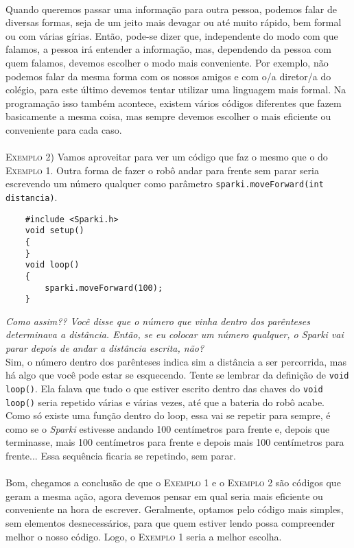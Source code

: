     \paragraph{}
    Quando queremos passar uma informação para outra pessoa, podemos falar de diversas formas, seja de um jeito mais devagar ou até muito rápido, bem formal ou com várias gírias. Então, pode-se dizer que, independente do modo com que falamos, a pessoa irá entender a informação, mas, dependendo da pessoa com quem falamos, devemos escolher o modo mais conveniente. Por exemplo, não podemos falar da mesma forma com os nossos amigos e com o/a diretor/a do colégio, para este último devemos tentar utilizar uma linguagem mais formal. Na programação isso também acontece, existem vários códigos diferentes que fazem basicamente a mesma coisa, mas sempre devemos escolher o mais eficiente ou conveniente para cada caso.
    \\~\\
    \textsc{Exemplo 2)} Vamos aproveitar para ver um código que faz o mesmo que o do \textsc{Exemplo 1}. Outra forma de fazer o robô andar para frente sem parar seria escrevendo um número qualquer como parâmetro \texttt{sparki.moveForward(int distancia)}.
    
    \begin{verbatim}
    #include <Sparki.h>
    void setup()
    {
    }
    void loop()
    {
        sparki.moveForward(100);
    }
    \end{verbatim}
    
    \textit{Como assim?? Você disse que o número que vinha dentro dos parênteses determinava a distância. Então, se eu colocar um número qualquer, o \textsl{Sparki} vai parar depois de andar a distância escrita, não?} \\
    Sim, o número dentro dos parênteses indica sim a distância a ser percorrida, mas há algo que você pode estar se esquecendo. Tente se lembrar da definição de \texttt{void loop()}. Ela falava que tudo o que estiver escrito dentro das chaves do \texttt{void loop()} seria repetido várias e várias vezes, até que a bateria do robô acabe. Como só existe uma função dentro do loop, essa vai se repetir para sempre, é como se o \textsl{Sparki} estivesse andando 100 centímetros para frente e, depois que terminasse, mais 100 centímetros para frente e depois mais 100 centímetros para frente... Essa sequência ficaria se repetindo, sem parar.
    
    \paragraph{}
    Bom, chegamos a conclusão de que o \textsc{Exemplo 1} e o \textsc{Exemplo 2} são códigos que geram a mesma ação, agora devemos pensar em qual seria mais eficiente ou conveniente na hora de escrever. Geralmente, optamos pelo código mais simples, sem elementos desnecessários, para que quem estiver lendo possa compreender melhor o nosso código. Logo, o \textsc{Exemplo 1} seria a melhor escolha.
    
